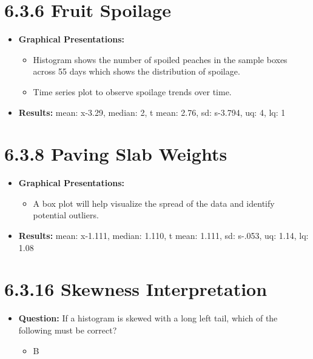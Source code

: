 \documentclass{article}
\begin{document}
\section*{6.3.6 Fruit Spoilage}
\begin{itemize}
    \item \textbf{Graphical Presentations:} 
    \begin{itemize}
        \item Histogram shows the number of spoiled peaches in the sample boxes across 55 days which shows the distribution of spoilage.
        \item Time series plot to observe spoilage trends over time.
    \end{itemize}
    \item \textbf{Results:} mean: x-3.29, median: 2, t mean: 2.76, sd: s-3.794, uq: 4, lq: 1

\end{itemize}

\section*{6.3.8 Paving Slab Weights}
\begin{itemize}
    \item \textbf{Graphical Presentations:} 
    \begin{itemize}
Hhistogram - shows the distribution of paving slab weights helps assess whether the weights follow a normal distribution.
        \item A box plot will help visualize the spread of the data and identify potential outliers.
    \end{itemize}
    \item     \textbf{Results:} mean: x-1.111, median: 1.110, t mean: 1.111, sd: s-.053, uq: 1.14, lq: 1.08
\end{itemize}

\section*{6.3.16 Skewness Interpretation}
\begin{itemize}
    \item \textbf{Question:} If a histogram is skewed with a long left tail, which of the following must be correct?
    \begin{itemize}
        \item B
        \end{itemize}
\end{itemize}
\end{document}
